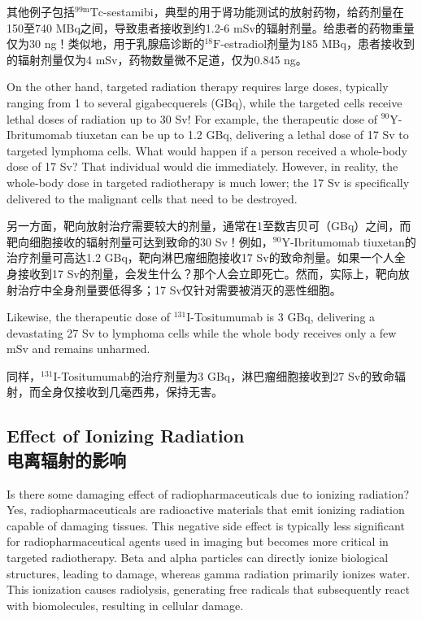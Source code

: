 \documentclass[dvipsnames, svgnames,a4paper,11pt]{article}
\begin{document}
其他例子包括${}^\text{99m}\text{Tc}$-sestamibi，典型的用于肾功能测试的放射药物，给药剂量在150至740 MBq之间，导致患者接收到约1.2-6 mSv的辐射剂量。给患者的药物重量仅为30 ng！类似地，用于乳腺癌诊断的${}^\text{18}\text{F}$-estradiol剂量为185 MBq，患者接收到的辐射剂量仅为4 mSv，药物数量微不足道，仅为0.845 ng。

On the other hand, targeted radiation therapy requires large doses, typically ranging from 1 to several gigabecquerels (GBq), while the targeted cells receive lethal doses of radiation up to 30 Sv! For example, the therapeutic dose of ${}^\text{90}\text{Y}$-Ibritumomab tiuxetan can be up to 1.2 GBq, delivering a lethal dose of 17 Sv to targeted lymphoma cells. What would happen if a person received a whole-body dose of 17 Sv? That individual would die immediately. However, in reality, the whole-body dose in targeted radiotherapy is much lower; the 17 Sv is specifically delivered to the malignant cells that need to be destroyed.

另一方面，靶向放射治疗需要较大的剂量，通常在1至数吉贝可（GBq）之间，而靶向细胞接收的辐射剂量可达到致命的30 Sv！例如，${}^\text{90}\text{Y}$-Ibritumomab tiuxetan的治疗剂量可高达1.2 GBq，靶向淋巴瘤细胞接收17 Sv的致命剂量。如果一个人全身接收到17 Sv的剂量，会发生什么？那个人会立即死亡。然而，实际上，靶向放射治疗中全身剂量要低得多；17 Sv仅针对需要被消灭的恶性细胞。

Likewise, the therapeutic dose of ${}^\text{131}\text{I}$-Tositumumab is 3 GBq, delivering a devastating 27 Sv to lymphoma cells while the whole body receives only a few mSv and remains unharmed.

同样，${}^\text{131}\text{I}$-Tositumumab的治疗剂量为3 GBq，淋巴瘤细胞接收到27 Sv的致命辐射，而全身仅接收到几毫西弗，保持无害。

\subsection{Effect of Ionizing Radiation\\电离辐射的影响}
Is there some damaging effect of radiopharmaceuticals due to ionizing radiation? Yes, radiopharmaceuticals are radioactive materials that emit ionizing radiation capable of damaging tissues. This negative side effect is typically less significant for radiopharmaceutical agents used in imaging but becomes more critical in targeted radiotherapy. Beta and alpha particles can directly ionize biological structures, leading to damage, whereas gamma radiation primarily ionizes water. This ionization causes radiolysis, generating free radicals that subsequently react with biomolecules, resulting in cellular damage.
\end{document}

